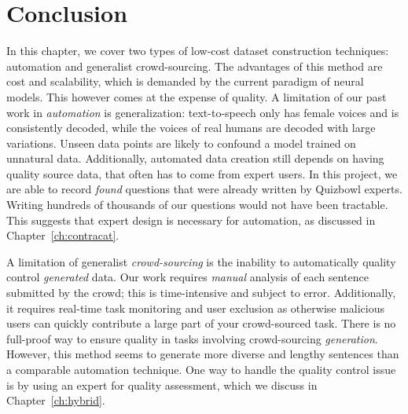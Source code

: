 \section{Conclusion}
\label{sec:automated_conclusion}

In this chapter, we cover two types of low-cost dataset construction techniques: automation and generalist crowd-sourcing.  
%
The advantages of this method are cost and scalability, which is demanded by the current paradigm of neural models.   
%
This however comes at the expense of quality.  
%
A limitation of our past work in \textit{automation} is generalization: text-to-speech only has female voices and is consistently decoded, while the voices of real humans are decoded with large variations.  
%
Unseen data points are likely to confound a model trained on unnatural data.  
%
Additionally, automated data creation still depends on having quality source data, that often has to come from expert users.
%
In this project, we are able to record \textit{found} questions that were already written by Quizbowl experts.  
%
Writing hundreds of thousands of our questions would not have been tractable.
%
This suggests that expert design is necessary for automation, as discussed in Chapter~\ref{ch:contracat}.

A limitation of generalist \textit{crowd-sourcing} is the inability to automatically quality control \textit{generated} data.  
%
Our work requires \textit{manual} analysis of each sentence submitted by the crowd; this is time-intensive and subject to error.  
%
Additionally, it requires real-time task monitoring and user exclusion as otherwise malicious users can quickly contribute a large part of your crowd-sourced task.  
%
There is no full-proof way to ensure quality in tasks involving crowd-sourcing \textit{generation}.
%
However, this method seems to generate more diverse and lengthy sentences than a comparable automation technique.   
%
One way to handle the quality control issue is by using an expert for quality assessment, which we discuss in Chapter~\ref{ch:hybrid}. 
